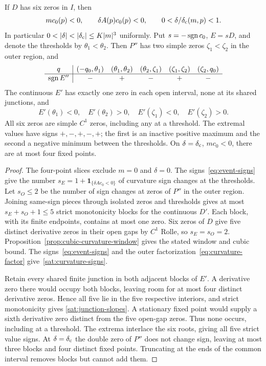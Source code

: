 \begin{lemma}
\label{sat:saturation}\label{corner:saturated-geometry}
\label{cor:six-necessary-window}
If $D$ has six zeros in $I$, then
\[
 mc_0(p)<0,\qquad \delta A(p)c_0(p)<0,\qquad
 0<\delta/\delta_{\rm c}(m,p)<1.
\]
In particular $0<|\delta|<|\delta_{\rm c}|\le K|m|^3$ uniformly.
Put $s=-\operatorname{sgn} c_0$, $E=sD$, and denote the thresholds by $\theta_1<\theta_2$.
Then $P''$ has two simple zeros $\zeta_1<\zeta_2$ in the outer region, and
\begin{equation}\label{sat:curvature-signs}
 \begin{array}{c|ccccc}
 q&(-q_0,\theta_1)&(\theta_1,\theta_2)&(\theta_2,\zeta_1)&
       (\zeta_1,\zeta_2)&(\zeta_2,q_0)\\ \hline
 \operatorname{sgn} E''&-&+&-&+&-
 \end{array}
\end{equation}
The continuous $E'$ has exactly one zero in each open interval, none
at its shared junctions, and
\begin{equation}\label{sat:junction-slopes}
 E'(\theta_1)<0,\quad E'(\theta_2)>0,\quad
 E'(\zeta_1)<0,\quad E'(\zeta_2)>0.
\end{equation}
All six zeros are simple $C^1$ zeros, including any at a threshold.
The extremal values have signs $+,-,+,-,+$; the first is an inactive
positive maximum and the second a negative minimum between the thresholds.
On $\delta=\delta_{\rm c}$, $mc_0<0$, there are at most four fixed points.
\end{lemma}

\begin{proof}
The four-point slices exclude $m=0$ and $\delta=0$.
The signs~\eqref{eq:event-signs} give the number
$s_E=1+\mathbf1_{\{\delta Ac_0<0\}}$ of curvature sign changes at the thresholds.
Let $s_O\le2$ be the number of sign changes at zeros of $P''$ in the outer
region. Joining same-sign pieces through isolated zeros and thresholds gives at most $s_E+s_O+1\le5$
strict monotonicity blocks for the continuous $D'$. Each block,
with its finite endpoints, contains at most one zero. Six zeros of
$D$ give five distinct derivative zeros in their open gaps by $C^1$
Rolle, so $s_E=s_O=2$. Proposition~\ref{prop:cubic-curvature-window}
gives the stated window and cubic bound. The signs~\eqref{eq:event-signs} and the outer
factorization~\eqref{eq:curvature-factor} give~\eqref{sat:curvature-signs}.

Retain every shared finite junction in both adjacent blocks of $E'$.
A derivative zero there would occupy both blocks, leaving room for at
most four distinct derivative zeros. Hence all five lie in the five
respective interiors, and strict monotonicity gives
\eqref{sat:junction-slopes}. A stationary fixed point would supply a
sixth derivative zero distinct from the five open-gap zeros. Thus none
occurs, including at a threshold.
The extrema interlace the six roots, giving all five strict value signs.
At $\delta=\delta_{\rm c}$ the double zero of $P''$ does not change sign, leaving at most three blocks and four distinct fixed
points. Truncating at the ends of the common interval removes blocks
but cannot add them.
\end{proof}

